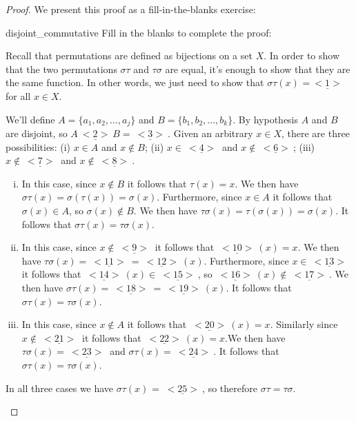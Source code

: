 \begin{proof} We present this proof as a fill-in-the-blanks exercise:

\begin{exercise}{disjoint_commutative} Fill in the blanks  to complete the proof:

Recall that permutations are defined as bijections on a set $X$. In order to show that the two permutations 
$\sigma \tau$ and $\tau \sigma$ are equal, it's enough to show that they are the same function. In other words, we just need to show that $\sigma \tau (x)$ =$\underline{ ~<1>~}$ for all $x \in X$.

We'll define $A = \{a_1, a_2, \ldots, a_j\}$ and $B = \{b_1, b_2, \ldots, b_k\}$. By hypothesis $A$ and $B$ are disjoint, so $A \underline{ ~<2>~} B = \underline{ ~<3>~}$. Given an arbitrary $x \in X$, there are three possibilities: (i) $x \in A$ and $x \notin B$; (ii) $x \in \underline{ ~<4>~}$ and $x \notin \underline{ ~<6>~}$; (iii) $x \notin \underline{ ~<7>~}$ and $x \notin \underline{ ~<8>~}$. 

\begin{enumerate}[(i)]
\item
In this case, since $x \notin B$ it follows that $\tau(x) = x$. We then have $\sigma \tau (x) = \sigma(\tau(x)) = \sigma(x)$. Furthermore, since $x \in A$ it follows that $\sigma(x) \in A$, so $\sigma(x) \notin B$. We then have $\tau \sigma (x) = \tau(\sigma(x)) = \sigma(x)$. It follows that $\sigma \tau (x) = \tau \sigma (x)$.
\item
In this case, since $x \notin \underline{ ~<9>~}$ it follows that $\underline{ ~<10>~}(x) = x$. We then have $\tau \sigma (x) = \underline{ ~<11>~} = \underline{ ~<12>~}(x)$. Furthermore, since $x \in \underline{ ~<13>~}$ it follows that $\underline{ ~<14>~}(x) \in \underline{ ~<15>~}$, so $\underline{ ~<16>~}(x) \notin \underline{ ~<17>~}$. We then have $\sigma \tau (x) = \underline{ ~<18>~} = \underline{ ~<19>~}(x)$. It follows that $\sigma \tau (x) = \tau \sigma (x)$.
\item
In this case, since $x \notin A$ it follows that $\underline{ ~<20>~}(x) = x$. Similarly since $x \notin \underline{ ~<21>~}$ it follows that $\underline{ ~<22>~}(x) = x$.We then have $\tau \sigma (x) = \underline{ ~<23>~}$ and $\sigma \tau (x) = \underline{ ~<24>~}$. It follows that $\sigma \tau (x) = \tau \sigma (x)$.
\end{enumerate}

\noindent
In all three cases we have $\sigma \tau (x)$ = $\underline{ ~<25>~}$, so therefore $\sigma \tau = \tau \sigma$.
\end{exercise}
\end{proof}

